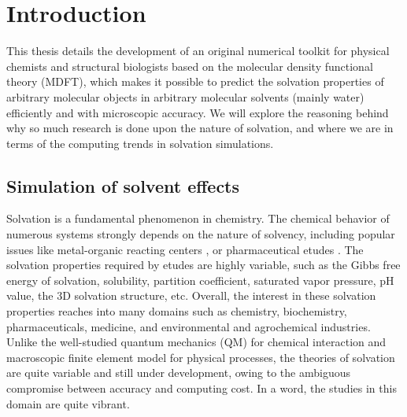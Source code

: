 
\chapter{Introduction\label{chpt:introduction}}

This thesis details the development of an original numerical toolkit for
physical chemists and structural biologists based on the molecular
density functional theory (\acs{MDFT}), which makes it possible to
predict the solvation properties of arbitrary molecular objects in arbitrary molecular solvents
(mainly water) efficiently and with microscopic accuracy. We will explore the reasoning behind why so much research is done upon the nature
of solvation, and where we are in terms of the computing trends in solvation
simulations.


\section{Simulation of solvent effects}

Solvation is a fundamental phenomenon in chemistry. The chemical behavior
of numerous systems strongly depends on the nature of solvency, including popular issues like metal-organic reacting centers
\citep{Mn-oxo,PCET}, or pharmaceutical etudes \citep{drug_1_Perlovich,drug_2_Perlovich,drug_3}.
The solvation properties required by etudes %
are highly variable, such
as the Gibbs free energy of solvation, solubility, partition coefficient,
saturated vapor pressure, pH value, the 3D solvation structure,
etc. Overall, the interest in these solvation properties reaches into
many domains such as chemistry, biochemistry, pharmaceuticals, medicine, and
environmental and agrochemical industries. Unlike the well-studied
quantum mechanics (\acs{QM}) for chemical interaction and macroscopic
finite element model for physical processes, the theories of solvation
are quite variable and still under development, owing to the ambiguous
compromise between accuracy and computing cost. In a word,
the studies in this domain are quite vibrant.

